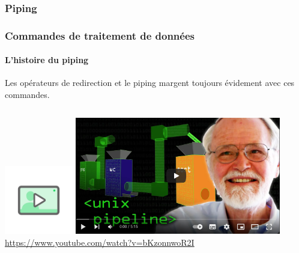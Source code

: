 \documentclass{beamer}
\begin{document}
    \subsubsection{Piping}\label{subsubsec:piping}
    \begin{frame}
        \transdissolve
        \frametitle{Commandes de traitement de données}
        \framesubtitle{L'histoire du piping}
        Les opérateurs de redirection et le piping margent toujours évidement avec ces commandes.
        \bigbreak
        \begin{columns}
            \centering
            \includegraphics[width=3cm]{image/digicomp-video}
            \includegraphics[width=9cm]{image/kernighan-piping-video} \\ \url{https://www.youtube.com/watch?v=bKzonnwoR2I} \\
        \end{columns}
    \end{frame}
\end{document}
